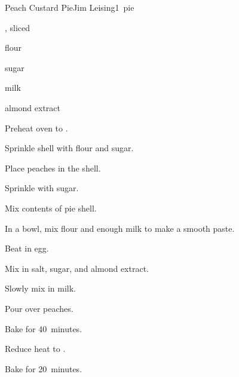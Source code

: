 \begin{recipe}{Peach Custard Pie}{Jim Leising}{1~pie}

\begin{ingredients}
\item {}, sliced
\item flour
\item sugar
\item milk
\item \tp{\half} almond extract
\end{ingredients}

\begin{directions}
\item Preheat oven to .
\item Sprinkle shell with flour and sugar.
\item Place peaches in the shell.
\item Sprinkle with \C{\threequarter} sugar.
\item Mix contents of pie shell.
\item In a bowl, mix  flour and enough milk to make a smooth paste.
\item Beat in egg.
\item Mix in salt,  sugar, and almond extract.
\item Slowly mix in \C{\half} milk.
\item Pour over peaches.
\item Bake for 40~minutes.
\item Reduce heat to .
\item Bake for 20~minutes.
\end{directions}

\end{recipe}
